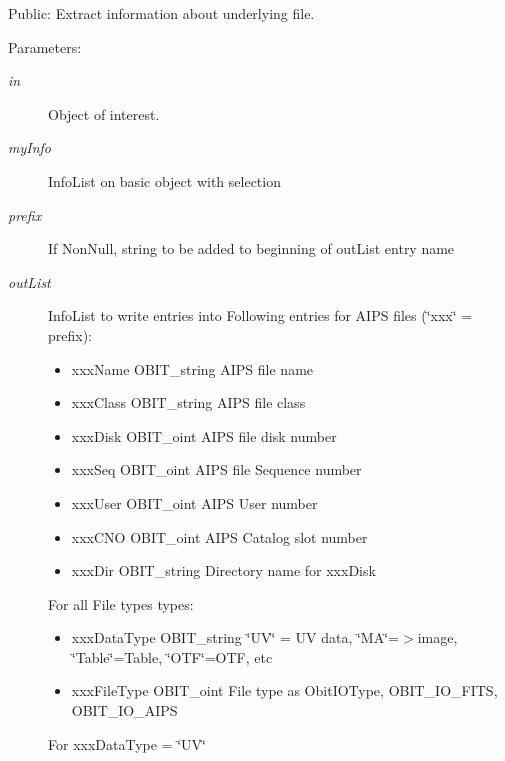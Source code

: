 Public: Extract information about underlying file. 

\begin{Desc}
\item[Parameters:]
\begin{description}
\item[{\em in}]Object of interest. \item[{\em my\-Info}]Info\-List on basic object with selection \item[{\em prefix}]If Non\-Null, string to be added to beginning of out\-List entry name \item[{\em out\-List}]Info\-List to write entries into Following entries for AIPS files (\char`\"{}xxx\char`\"{} = prefix): \begin{itemize}
\item xxx\-Name OBIT\_\-string AIPS file name \item xxx\-Class OBIT\_\-string AIPS file class \item xxx\-Disk OBIT\_\-oint AIPS file disk number \item xxx\-Seq OBIT\_\-oint AIPS file Sequence number \item xxx\-User OBIT\_\-oint AIPS User number \item xxx\-CNO OBIT\_\-oint AIPS Catalog slot number \item xxx\-Dir OBIT\_\-string Directory name for xxx\-Disk\end{itemize}
For all File types types: \begin{itemize}
\item xxx\-Data\-Type OBIT\_\-string \char`\"{}UV\char`\"{} = UV data, \char`\"{}MA\char`\"{}=$>$image, \char`\"{}Table\char`\"{}=Table, \char`\"{}OTF\char`\"{}=OTF, etc \item xxx\-File\-Type OBIT\_\-oint File type as Obit\-IOType, OBIT\_\-IO\_\-FITS, OBIT\_\-IO\_\-AIPS\end{itemize}
For xxx\-Data\-Type = \char`\"{}UV\char`\"{} \begin{itemize}

\end{itemize}
\end{description}
\end{Desc}
